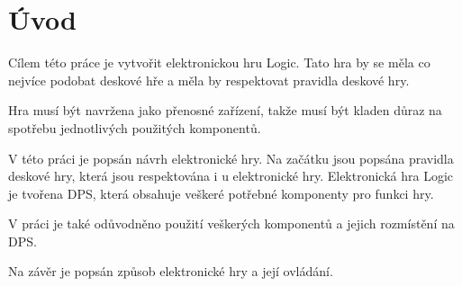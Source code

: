 \chapter*{Úvod}
{}

Cílem této práce je vytvořit elektronickou hru Logic. Tato hra by se měla co nejvíce podobat deskové hře a měla by respektovat pravidla deskové hry.

Hra musí být navržena jako přenosné zařízení, takže musí být kladen důraz na spotřebu jednotlivých použitých komponentů.

V této práci je popsán návrh elektronické hry. Na začátku jsou popsána pravidla deskové hry, která jsou respektována i u elektronické hry. Elektronická hra Logic 
je tvořena DPS, která obsahuje veškeré potřebné komponenty pro funkci hry.

V práci je také odůvodněno použití veškerých komponentů a jejich rozmístění na DPS.

Na závěr je popsán způsob elektronické hry a její ovládání.


